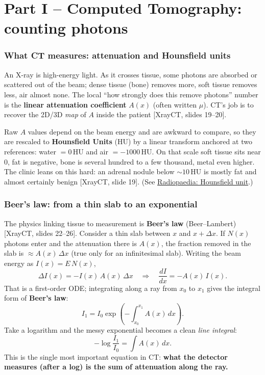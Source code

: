 \documentclass[11pt]{article}
\newcommand{\deck}[1]{\textsf{\small[#1]}}
\begin{document}
\part*{Part I -- Computed Tomography: counting photons}

\section{What CT measures: attenuation and Hounsfield units}

An X-ray is high-energy light. As it crosses tissue, some photons are absorbed
or scattered out of the beam; dense tissue (bone) removes more, soft tissue
removes less, air almost none. The local ``how strongly does this remove
photons'' number is the \textbf{linear attenuation coefficient} $A(x)$ (often
written $\mu$). CT's job is to recover the 2D/3D \emph{map} of $A$ inside the
patient \deck{XrayCT, slides 19--20}.

Raw $A$ values depend on the beam energy and are awkward to compare, so they are
rescaled to \textbf{Hounsfield Units} (HU) by a linear transform anchored at two
references: water $=0$\,HU and air $=-1000$\,HU. On that scale soft tissue sits
near $0$, fat is negative, bone is several hundred to a few thousand, metal even
higher. The clinic leans on this hard: an adrenal nodule below $\sim 10$\,HU is
mostly fat and almost certainly benign \deck{XrayCT, slide 19}. (See
\href{https://radiopaedia.org/articles/hounsfield-unit}{Radiopaedia: Hounsfield
unit}.)

\section{Beer's law: from a thin slab to an exponential}

The physics linking tissue to measurement is \textbf{Beer's law} (Beer--Lambert)
\deck{XrayCT, slides 22--26}. Consider a thin slab between $x$ and $x+\Delta x$.
If $N(x)$ photons enter and the attenuation there is $A(x)$, the fraction
removed in the slab is $\approx A(x)\,\Delta x$ (true only for an infinitesimal
slab). Writing the beam energy as $I(x)=E\,N(x)$,
\[
\Delta I(x) = -I(x)\,A(x)\,\Delta x
\quad\Longrightarrow\quad
\frac{dI}{dx} = -A(x)\,I(x).
\]
That is a first-order ODE; integrating along a ray from $x_0$ to $x_1$ gives the
integral form of \textbf{Beer's law}:
\[
\boxed{\;I_1 = I_0 \exp\!\left(-\int_{x_0}^{x_1} A(x)\,dx\right).\;}
\]
Take a logarithm and the messy exponential becomes a clean \emph{line integral}:
\[
-\log\!\frac{I_1}{I_0} = \int A(x)\,dx.
\]
This is the single most important equation in CT: \textbf{what the detector
measures (after a log) is the sum of attenuation along the ray.}
\end{document}
